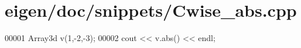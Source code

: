 \hypertarget{eigen_2doc_2snippets_2_cwise__abs_8cpp_source}{}\section{eigen/doc/snippets/\+Cwise\+\_\+abs.cpp}
\label{eigen_2doc_2snippets_2_cwise__abs_8cpp_source}

\begin{DoxyCode}
00001 Array3d v(1,-2,-3);
00002 cout << v.abs() << endl;
\end{DoxyCode}
